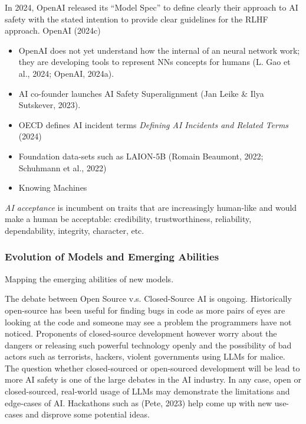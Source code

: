 \documentclass[
  letterpaper,
  DIV=11,
  numbers=noendperiod]{scrartcl}
\begin{document}
In 2024, OpenAI released its ``Model Spec'' to define clearly their
approach to AI safety with the stated intention to provide clear
guidelines for the RLHF approach. OpenAI (2024c)

\begin{itemize}
\item
  OpenAI does not yet understand how the internal of an neural network
  work; they are developing tools to represent NNs concepts for humans
  (L. Gao et al., 2024; OpenAI, 2024a).
\item
  AI co-founder launches AI Safety Superalignment (Jan Leike \& Ilya
  Sutskever, 2023).
\item
  OECD defines AI incident terms \emph{Defining {AI} Incidents and
  Related Terms} (2024)
\item
  Foundation data-sets such as LAION-5B (Romain Beaumont, 2022;
  Schuhmann et al., 2022)
\item
  Knowing Machines
\end{itemize}

\emph{AI acceptance} is incumbent on traits that are increasingly
human-like and would make a human be acceptable: credibility,
trustworthiness, reliability, dependability, integrity, character, etc.

\subsubsection{Evolution of Models and Emerging
Abilities}\label{evolution-of-models-and-emerging-abilities}

Mapping the emerging abilities of new models.

The debate between Open Source v.s. Closed-Source AI is ongoing.
Historically open-source has been useful for finding bugs in code as
more pairs of eyes are looking at the code and someone may see a problem
the programmers have not noticed. Proponents of closed-source
development however worry about the dangers or releasing such powerful
technology openly and the possibility of bad actors such as terrorists,
hackers, violent governments using LLMs for malice. The question whether
closed-sourced or open-sourced development will be lead to more AI
safety is one of the large debates in the AI industry. In any case, open
or closed-sourced, real-world usage of LLMs may demonstrate the
limitations and edge-cases of AI. Hackathons such as (Pete, 2023) help
come up with new use-cases and disprove some potential ideas.
\end{document}
